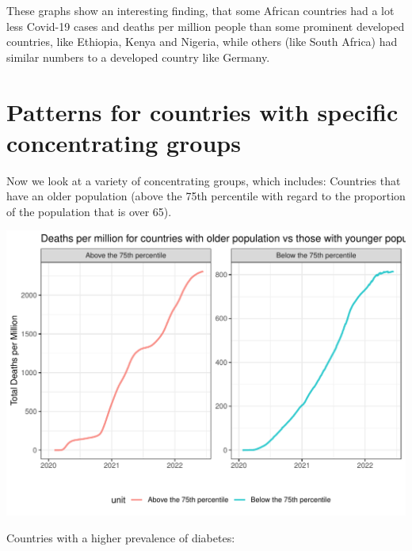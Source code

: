 \documentclass[11pt,preprint, authoryear]{elsarticle}
\let\origfigure\figure
\let\endorigfigure\endfigure
\renewenvironment{figure}[1][2] {
    \expandafter\origfigure\expandafter[H]
} {
    \endorigfigure
}
\numberwithin{equation}{section}
\numberwithin{figure}{section}
\numberwithin{table}{section}
\begin{document}
These graphs show an interesting finding, that some African countries
had a lot less Covid-19 cases and deaths per million people than some
prominent developed countries, like Ethiopia, Kenya and Nigeria, while
others (like South Africa) had similar numbers to a developed country
like Germany.

\hypertarget{patterns-for-countries-with-specific-concentrating-groups}{%
\section{\texorpdfstring{Patterns for countries with specific
concentrating groups
\label{-}}{Patterns for countries with specific concentrating groups }}\label{patterns-for-countries-with-specific-concentrating-groups}}

Now we look at a variety of concentrating groups, which includes:
Countries that have an older population (above the 75th percentile with
regard to the proportion of the population that is over 65).

\begin{figure}[H]

{\centering \includegraphics{Question_1_files/figure-latex/Figure5-1} 

}

\caption{\label{Figure1}}\label{fig:Figure5}
\end{figure}

Countries with a higher prevalence of diabetes:
\end{document}
